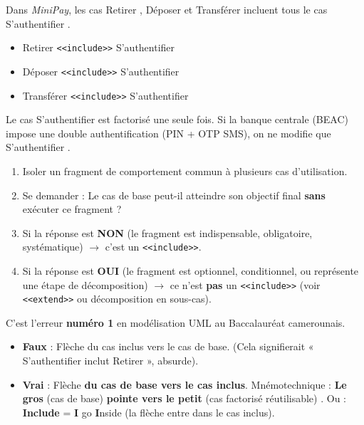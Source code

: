 \documentclass[11pt]{article}
\begin{document}
\begin{exemplebox}
Dans \emph{MiniPay}, les cas \guillemotleft Retirer \guillemotright, \guillemotleft Déposer \guillemotright et \guillemotleft Transférer \guillemotright incluent tous le cas \guillemotleft S'authentifier \guillemotright.
\begin{itemize}
    \item \guillemotleft Retirer \guillemotright \texttt{<<include>>} \guillemotleft S'authentifier \guillemotright
    \item \guillemotleft Déposer \guillemotright \texttt{<<include>>} \guillemotleft S'authentifier \guillemotright
    \item \guillemotleft Transférer \guillemotright \texttt{<<include>>} \guillemotleft S'authentifier \guillemotright
\end{itemize}
Le cas \guillemotleft S'authentifier \guillemotright est factorisé une seule fois. Si la banque centrale (BEAC) impose une double authentification (PIN + OTP SMS), on ne modifie que \guillemotleft S'authentifier \guillemotright.
\end{exemplebox}

\begin{methode}
\begin{enumerate}
    \item Isoler un fragment de comportement commun à plusieurs cas d'utilisation.
    \item Se demander : \guillemotleft Le cas de base peut-il atteindre son objectif final \textbf{sans} exécuter ce fragment ? \guillemotright
    \item Si la réponse est \textbf{NON} (le fragment est indispensable, obligatoire, systématique) $\rightarrow$ c'est un \texttt{<<include>>}.
    \item Si la réponse est \textbf{OUI} (le fragment est optionnel, conditionnel, ou représente une étape de décomposition) $\rightarrow$ ce n'est \textbf{pas} un \texttt{<<include>>} (voir \texttt{<<extend>>} ou décomposition en sous-cas).
\end{enumerate}
\end{methode}

\begin{attention}
C'est l'erreur \textbf{numéro 1} en modélisation UML au Baccalauréat camerounais.
\begin{itemize}
    \item \textbf{Faux} : Flèche du cas inclus vers le cas de base. (Cela signifierait « S'authentifier inclut Retirer », absurde).
    \item \textbf{Vrai} : Flèche \textbf{du cas de base vers le cas inclus}. Mnémotechnique : \guillemotleft \textbf{Le gros} (cas de base) \textbf{pointe vers le petit} (cas factorisé réutilisable) \guillemotright. Ou : \guillemotleft \textbf{Include} = \textbf{I} go \textbf{I}nside \guillemotright (la flèche entre dans le cas inclus).
\end{itemize}
\end{attention}
\end{document}
